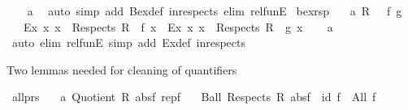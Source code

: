 \begin{isabellebody}
%
\isadelimproof
\ \ %
\endisadelimproof
%
\isatagproof
{}\isamarkupfalse%
\ a\ \isamarkupfalse%
\ {\isacharparenleft}{\kern0pt}auto\ simp\ add{\isacharcolon}{\kern0pt}\ Bex{\isacharunderscore}{\kern0pt}def\ in{\isacharunderscore}{\kern0pt}respects\ elim{\isacharcolon}{\kern0pt}\ rel{\isacharunderscore}{\kern0pt}funE{\isacharparenright}{\kern0pt}%
\endisatagproof
{\isafoldproof}%
%
\isadelimproof
\isanewline
%
\endisadelimproof
\isanewline
{}\isamarkupfalse%
\ bex{}{\isacharunderscore}{\kern0pt}rsp{\isacharcolon}{\kern0pt}\isanewline
\ \ \ a{\isacharcolon}{\kern0pt}\ {\isachardoublequoteopen}{\isacharparenleft}{\kern0pt}R\ {\isacharequal}{\kern0pt}{\isacharequal}{\kern0pt}{\isacharequal}{\kern0pt}{\isachargreater}{\kern0pt}\ {\isacharparenleft}{\kern0pt}{\isacharequal}{\kern0pt}{\isacharparenright}{\kern0pt}{\isacharparenright}{\kern0pt}\ f\ g{\isachardoublequoteclose}\isanewline
\ \ \ {\isachardoublequoteopen}Ex{}\ {\isacharparenleft}{\kern0pt}{\isasymlambda}x{\isachardot}{\kern0pt}\ x\ {\isasymin}\ Respects\ R\ {\isasymand}\ f\ x{\isacharparenright}{\kern0pt}\ {\isacharequal}{\kern0pt}\ Ex{}\ {\isacharparenleft}{\kern0pt}{\isasymlambda}x{\isachardot}{\kern0pt}\ x\ {\isasymin}\ Respects\ R\ {\isasymand}\ g\ x{\isacharparenright}{\kern0pt}{\isachardoublequoteclose}\isanewline
%
\isadelimproof
\ \ %
\endisadelimproof
%
\isatagproof
{}\isamarkupfalse%
\ a\ \isamarkupfalse%
\ {\isacharparenleft}{\kern0pt}auto\ elim{\isacharcolon}{\kern0pt}\ rel{\isacharunderscore}{\kern0pt}funE\ simp\ add{\isacharcolon}{\kern0pt}\ Ex{}{\isacharunderscore}{\kern0pt}def\ in{\isacharunderscore}{\kern0pt}respects{\isacharparenright}{\kern0pt}%
\endisatagproof
{\isafoldproof}%
%
\isadelimproof
%
\endisadelimproof
%
\begin{isamarkuptext}%
Two lemmas needed for cleaning of quantifiers%
\end{isamarkuptext}\isamarkuptrue%
\isamarkupfalse%
\ all{\isacharunderscore}{\kern0pt}prs{\isacharcolon}{\kern0pt}\isanewline
\ \ \ a{\isacharcolon}{\kern0pt}\ {\isachardoublequoteopen}Quotient{}\ R\ absf\ repf{\isachardoublequoteclose}\isanewline
\ \ \ {\isachardoublequoteopen}Ball\ {\isacharparenleft}{\kern0pt}Respects\ R{\isacharparenright}{\kern0pt}\ {\isacharparenleft}{\kern0pt}{\isacharparenleft}{\kern0pt}absf\ {\isacharminus}{\kern0pt}{\isacharminus}{\kern0pt}{\isacharminus}{\kern0pt}{\isachargreater}{\kern0pt}\ id{\isacharparenright}{\kern0pt}\ f{\isacharparenright}{\kern0pt}\ {\isacharequal}{\kern0pt}\ All\ f{\isachardoublequoteclose}\isanewline

\end{isabellebody}

